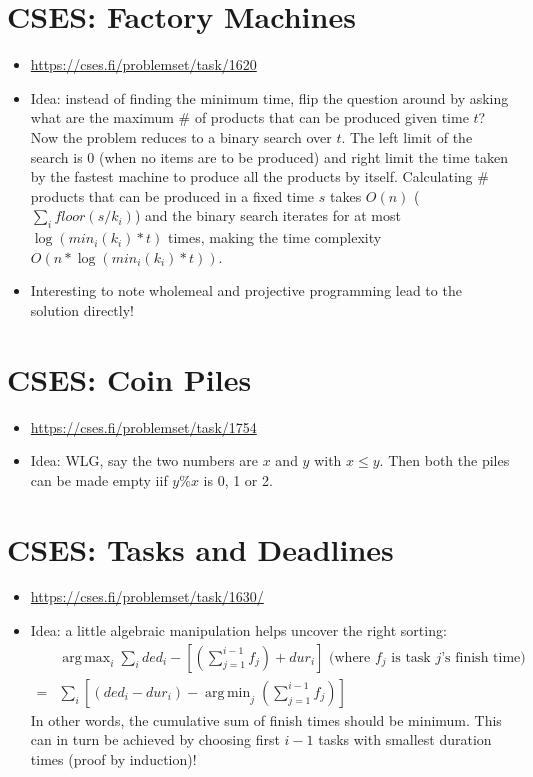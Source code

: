 \documentclass[titlepage, 12pt]{book}
\DeclareMathOperator*{\argmax}{arg\,max}
\DeclareMathOperator*{\argmin}{arg\,min}
\begin{document}
\section{CSES: Factory Machines}
\begin{itemize}
    \item \url{https://cses.fi/problemset/task/1620}
    \item Idea: instead of finding the minimum time, flip the question around by
        asking what are the maximum \# of products that can be produced given
        time $t$? Now the problem reduces to a binary search over $t$. The left
        limit of the search is 0 (when no items are to be produced) and right
        limit the time taken by the fastest machine to produce all the products
        by itself. Calculating \# products that can be produced in a fixed time
        $s$ takes $O(n)$ ($\sum_i floor(s/k_i)$) and the binary search iterates
        for at most $\log(min_i(k_i) * t)$ times, making the time complexity
        $O(n * \log(min_i(k_i) * t))$.
    \item Interesting to note wholemeal and projective programming lead to the
        solution directly!
\end{itemize}

\section{CSES: Coin Piles}
\begin{itemize}
    \item \url{https://cses.fi/problemset/task/1754}
    \item Idea: WLG, say the two numbers are $x$ and $y$ with $x \leq y$. Then both
        the piles can be made empty iif $y\%x$ is 0, 1 or 2.
\end{itemize}

\section{CSES: Tasks and Deadlines}
\begin{itemize}
    \item \url{https://cses.fi/problemset/task/1630/}
    \item Idea: a little algebraic manipulation helps uncover the right sorting:
        \begin{align*}
            &\argmax_{i}\sum_i ded_i - [(\sum_{j = 1}^{i - 1}f_j) + dur_i]
            \textrm{ (where $f_j$ is task $j$'s finish time)}\\
            = &\sum_{i} [(ded_i - dur_i) - \argmin_{j}(\sum_{j = 1}^{i - 1}f_j)]
        \end{align*}
        In other words, the cumulative sum of finish times should be minimum.
        This can in turn be achieved by choosing first $i - 1$ tasks with
        smallest duration times (proof by induction)!
\end{itemize}
\end{document}
